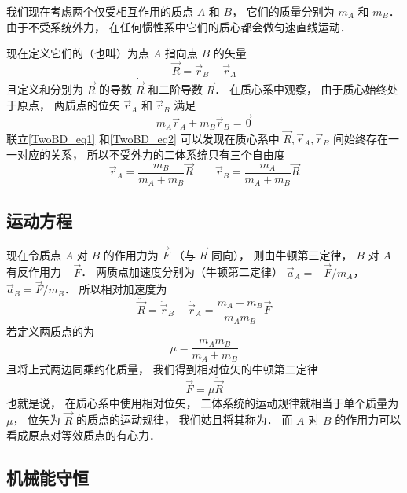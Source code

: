 

我们现在考虑两个仅受相互作用的质点 $A$ 和 $B$， 它们的质量分别为 $m_A$ 和 $m_B$． 由于不受系统外力， 在任何惯性系中它们的质心都会做匀速直线运动．%

现在定义它们的（也叫）为点 $A$ 指向点 $B$ 的矢量
\begin{equation}\label{TwoBD_eq1}
\vec R = \vec r_B - \vec r_A
\end{equation}
且定义和分别为 $\vec R$ 的导数 $\dot{\vec R}$ 和二阶导数 $\ddot{\vec R}$．
在质心系中观察， 由于质心始终处于原点， 两质点的位矢 $\vec r_A$ 和 $\vec r_B$ 满足
\begin{equation}\label{TwoBD_eq2}
m_A \vec r_A + m_B \vec r_B = \vec 0
\end{equation}
联立\autoref{TwoBD_eq1} 和\autoref{TwoBD_eq2} 可以发现在质心系中 $\vec R, \vec r_A, \vec r_B$ 间始终存在一一对应的关系， 所以不受外力的二体系统只有三个自由度
\begin{equation}\label{TwoBD_eq3}
\vec r_A = \frac{m_B}{m_A + m_B} \vec R \qquad \vec r_B = \frac{m_A}{m_A + m_B} \vec R
\end{equation}

\subsection{运动方程}

现在令质点 $A$ 对 $B$ 的作用力为 $\vec F$ （与 $\vec R$ 同向）， 则由牛顿第三定律， $B$ 对 $A$ 有反作用力 $- \vec F$． 两质点加速度分别为（牛顿第二定律） $\vec a_A =  -\vec F/m_A$， $\vec a_B =  \vec F/m_B$． 所以相对加速度为
\begin{equation}
\ddot{\vec R} = \ddot{\vec r}_B - \ddot{\vec r}_A = \frac{m_A+m_B}{m_Am_B} \vec F
\end{equation}
若定义两质点的为
\begin{equation}
\mu = \frac{m_A m_B}{m_A + m_B}
\end{equation}
且将上式两边同乘约化质量， 我们得到相对位矢的牛顿第二定律
\begin{equation}
\vec F = \mu\ddot{\vec R}
\end{equation}
也就是说， 在质心系中使用相对位矢， 二体系统的运动规律就相当于单个质量为 $\mu$， 位矢为 $\vec R$ 的质点的运动规律， 我们姑且将其称为． 而 $A$ 对 $B$ 的作用力可以看成原点对等效质点的有心力．

\subsection{机械能守恒}

